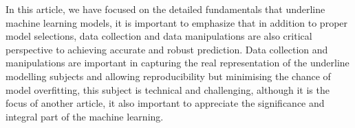 
\par
In this article, we have focused on the detailed fundamentals that underline machine learning models, it is important to emphasize that in addition to proper model selections, data collection and data manipulations are also critical perspective to achieving accurate and robust prediction. Data collection and manipulations are important in capturing the real representation of the underline modelling subjects and allowing reproducibility but minimising the chance of model overfitting, this subject is technical and challenging, although it is the focus of another article, it also important to appreciate the significance and integral part of the machine learning. 
\par 
